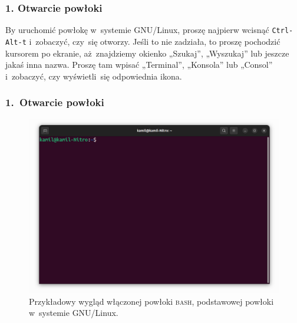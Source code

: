 \documentclass[10pt,t]{beamer}
\begin{document}
\begin{frame}
  \frametitle{1. Otwarcie powłoki}


  By uruchomić powłokę w~systemie GNU/Linux, proszę najpierw wcisnąć
  \texttt{Ctrl-Alt-t} i~zobaczyć, czy~się otworzy. Jeśli to nie zadziała,
  to proszę pochodzić kursorem po ekranie, aż~znajdziemy okienko „Szukaj”,
  „Wyszukaj” lub jeszcze jakaś inna nazwa. Proszę tam wpisać „Terminal”,
  „Konsola” lub „Consol” i~zobaczyć, czy wyświetli~się odpowiednia ikona.

\end{frame}





\begin{frame}
  \frametitle{1.~Otwarcie powłoki}


  \begin{figure}

    \centering


    \includegraphics[scale=0.23]
    {./Presentations-pictures/BASH-shell.png}


    \caption{Przykładowy wygląd włączonej powłoki \textsc{bash},
      podstawowej powłoki w~systemie GNU/Linux.}


    \label{fig:BASH-shell}

  \end{figure}

\end{frame}
\end{document}
